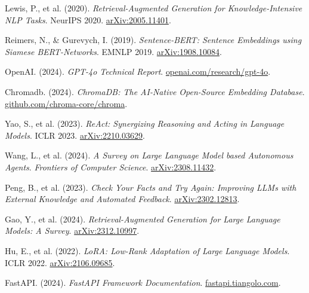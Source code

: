 \documentclass[12pt,letterpaper]{article}
\begin{document}
\begin{enumerate}[leftmargin=2em,label={[\arabic*]}]
  \item Lewis, P., et al. (2020).
        \textit{Retrieval-Augmented Generation for Knowledge-Intensive NLP Tasks}.
        NeurIPS 2020. \href{https://arxiv.org/abs/2005.11401}{arXiv:2005.11401}.

  \item Reimers, N., \& Gurevych, I. (2019).
        \textit{Sentence-BERT: Sentence Embeddings using Siamese BERT-Networks}.
        EMNLP 2019. \href{https://arxiv.org/abs/1908.10084}{arXiv:1908.10084}.

  \item OpenAI. (2024).
        \textit{GPT-4o Technical Report}.
        \href{https://openai.com/research/gpt-4o}{openai.com/research/gpt-4o}.

  \item Chromadb. (2024).
        \textit{ChromaDB: The AI-Native Open-Source Embedding Database}.
        \href{https://github.com/chroma-core/chroma}{github.com/chroma-core/chroma}.

  \item Yao, S., et al. (2023).
        \textit{ReAct: Synergizing Reasoning and Acting in Language Models}.
        ICLR 2023. \href{https://arxiv.org/abs/2210.03629}{arXiv:2210.03629}.

  \item Wang, L., et al. (2024).
        \textit{A Survey on Large Language Model based Autonomous Agents}.
        \textit{Frontiers of Computer Science}.
        \href{https://arxiv.org/abs/2308.11432}{arXiv:2308.11432}.

  \item Peng, B., et al. (2023).
        \textit{Check Your Facts and Try Again: Improving LLMs with External Knowledge and Automated Feedback}.
        \href{https://arxiv.org/abs/2302.12813}{arXiv:2302.12813}.

  \item Gao, Y., et al. (2024).
        \textit{Retrieval-Augmented Generation for Large Language Models: A Survey}.
        \href{https://arxiv.org/abs/2312.10997}{arXiv:2312.10997}.

  \item Hu, E., et al. (2022).
        \textit{LoRA: Low-Rank Adaptation of Large Language Models}.
        ICLR 2022. \href{https://arxiv.org/abs/2106.09685}{arXiv:2106.09685}.

  \item FastAPI. (2024).
        \textit{FastAPI Framework Documentation}.
        \href{https://fastapi.tiangolo.com}{fastapi.tiangolo.com}.
\end{enumerate}
\end{document}
